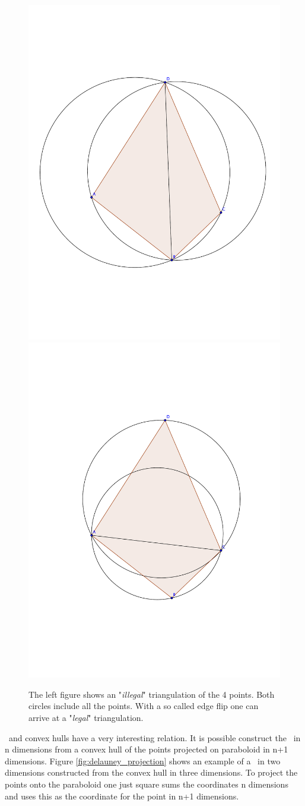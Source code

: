 \begin{figure}[htbp] %
   \centering
   \includegraphics[width=.45\textwidth]{chapter_ndinterp/plots/illegal_triangulation.pdf} 
   \includegraphics[width=.45\textwidth]{chapter_ndinterp/plots/edge_flip.pdf} 
   \caption{The left figure shows an "\textit{illegal}" triangulation of the 4 points. Both circles include all the points. With a so called edge flip one can arrive at a "\textit{legal}" triangulation.}
   \label{fig:delauney_allowed}
\end{figure}
\deltri\ and convex hulls have a very interesting relation. It is possible construct the \deltri\ in n dimensions from a convex hull of the points projected on paraboloid in n+1 dimensions.
Figure \ref{fig:delauney_projection} shows an example of a \deltri\ in two dimensions constructed from the convex hull in three dimensions. To project the points onto the paraboloid one just square sums the coordinates n dimensions and uses this as the coordinate for the point in n+1 dimensions. 


